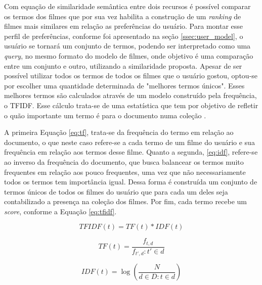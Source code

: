 Com equação de similaridade semântica entre dois recursos é possível comparar os termos dos filmes que por sua vez habilita a construção de um \textit{ranking} de filmes mais similares em relação as preferências do usuário. Para montar esse perfil de preferências, conforme foi apresentado na seção \ref{ssec:user_model}, o usuário se tornará um conjunto de termos, podendo ser interpretado como uma \textit{query}, no mesmo formato do modelo de filmes, onde objetivo é uma comparação entre um conjunto e outro, utilizando a similaridade proposta. Apesar de ser possível utilizar todos os termos de todos os filmes que o usuário gostou, optou-se por escolher uma quantidade determinada de "melhores termos únicos". Esses melhores termos são calculados através de um modelo construído pela frequência, o \ac{TFIDF}. Esse cálculo trata-se de uma estatística que tem por objetivo de refletir o quão importante um termo é para o documento numa coleção \citep{rajaraman_ullman_2011}.

A primeira Equação \ref{eq:tf}, trata-se da frequência do termo em relação ao documento, o que neste caso refere-se a cada termo de um filme do usuário e sua frequência em relação aos termos desse filme. Quanto a segunda, \ref{eq:idf}, refere-se ao inverso da frequência do documento, que busca balancear os termos muito frequentes em relação aos pouco frequentes, uma vez que não necessariamente todos os termos tem importância igual. Dessa forma é construída um conjunto de termos únicos de todos os filmes do usuário que para cada um deles seja contabilizado a presença na coleção dos filmes. Por fim, cada termo recebe um \textit{score}, conforme a Equação {\ref{eq:tfidf}}.

\begin{equation}
	TFIDF(t) = TF(t) * IDF(t)
\label{eq:tfidf}
\end{equation}

\begin{equation}
	TF(t) = \frac{f_{t,d}}{f_{t',d} : t' \in d}
\label{eq:tf}
\end{equation}

\begin{equation}
	IDF(t) = \log (\frac{N}{d \in D : t \in d})
\label{eq:idf}
\end{equation}

